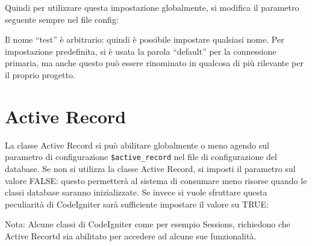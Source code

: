 Quindi per utilizzare questa impostazione globalmente, si modifica il parametro seguente sempre nel file config:


Il nome ``test'' è arbitrario: quindi è possibile impostare qualsiasi nome. Per impostazione predefinita, si è usata la parola ``default'' per la connessione primaria, ma anche questo può essere rinominato in qualcosa di più rilevante per il proprio progetto.

\section*{Active Record}
La classe Active Record si può abilitare globalmente o meno agendo sul parametro di configurazione \verb|$active_record| nel file di configurazione del database. Se non si utilizza la classe Active Record, si imposti il parametro sul valore FALSE: questo permetterà al sistema di consumare meno risorse quando le classi database saranno inizializzate. Se invece si vuole sfruttare questa peculiarità di CodeIgniter sarà sufficiente impostare il valore su TRUE:


Nota: Alcune classi di CodeIgniter come per esempio Sessions, richiedono che Active Recortd sia abilitato per accedere ad alcune sue funzionalità.

